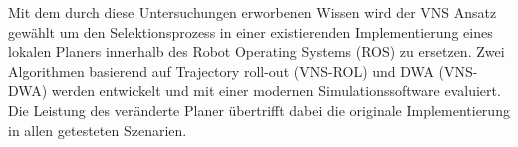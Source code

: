 Mit dem durch diese Untersuchungen erworbenen Wissen wird der VNS Ansatz gew\"ahlt um den Selektionsprozess in einer existierenden Implementierung eines lokalen Planers innerhalb des Robot Operating Systems (ROS) zu ersetzen. 
Zwei Algorithmen basierend auf Trajectory roll-out (VNS-ROL) und DWA (VNS-DWA) werden entwickelt und mit einer modernen Simulationssoftware evaluiert. 
Die Leistung des ver\"anderte Planer \"ubertrifft dabei die originale Implementierung in allen getesteten Szenarien. 

\endgroup			

\vfill